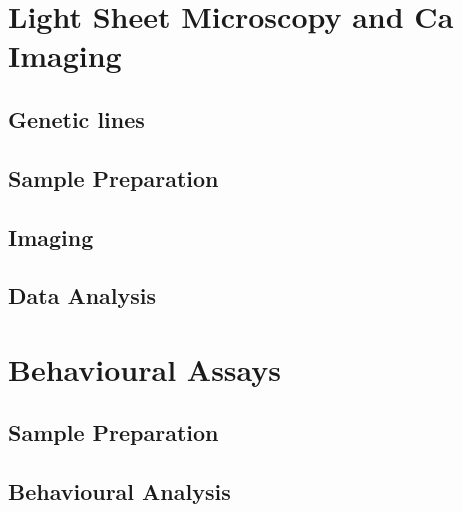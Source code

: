 \section{Light Sheet Microscopy and Ca Imaging}
\subsection{Genetic lines} %
\subsection{Sample Preparation}
\subsection{Imaging}
\subsection{Data Analysis}


\section{Behavioural Assays}
\subsection{Sample Preparation}
\subsection{Behavioural Analysis}









